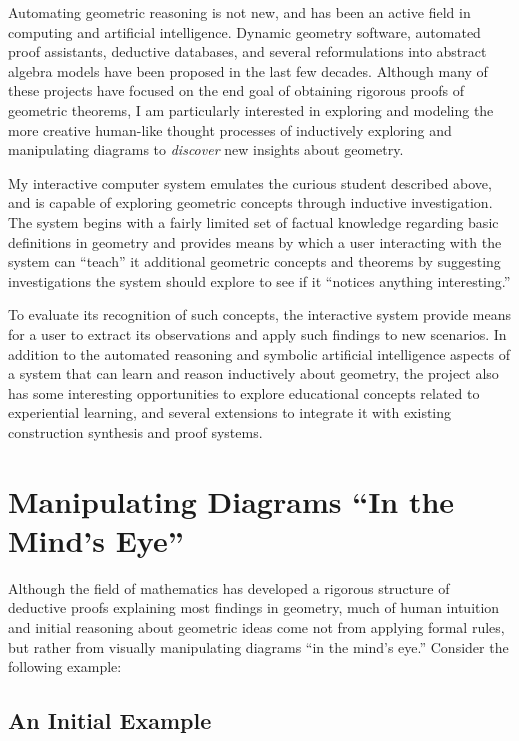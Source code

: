 Automating geometric reasoning is not new, and has been an active
field in computing and artificial intelligence.  Dynamic geometry
software, automated proof assistants, deductive databases, and several
reformulations into abstract algebra models have been proposed in the
last few decades.  Although many of these projects have focused on the
end goal of obtaining rigorous proofs of geometric theorems, I am
particularly interested in exploring and modeling the more creative
human-like thought processes of inductively exploring and manipulating
diagrams to \emph{discover} new insights about geometry.

My interactive computer system emulates the curious student described
above, and is capable of exploring geometric concepts through
inductive investigation.  The system begins with a fairly limited set
of factual knowledge regarding basic definitions in geometry and
provides means by which a user interacting with the system can
``teach'' it additional geometric concepts and theorems by suggesting
investigations the system should explore to see if it ``notices
anything interesting.''

To evaluate its recognition of such concepts, the interactive system
provide means for a user to extract its observations and apply such
findings to new scenarios.  In addition to the automated reasoning and
symbolic artificial intelligence aspects of a system that can learn
and reason inductively about geometry, the project also has some
interesting opportunities to explore educational concepts related to
experiential learning, and several extensions to integrate it with
existing construction synthesis and proof systems.

\section{Manipulating Diagrams ``In the Mind's Eye''}

Although the field of mathematics has developed a rigorous structure
of deductive proofs explaining most findings in geometry, much of
human intuition and initial reasoning about geometric ideas come not
from applying formal rules, but rather from visually manipulating
diagrams ``in the mind's eye.'' Consider the following example:

\subsection{An Initial Example}

